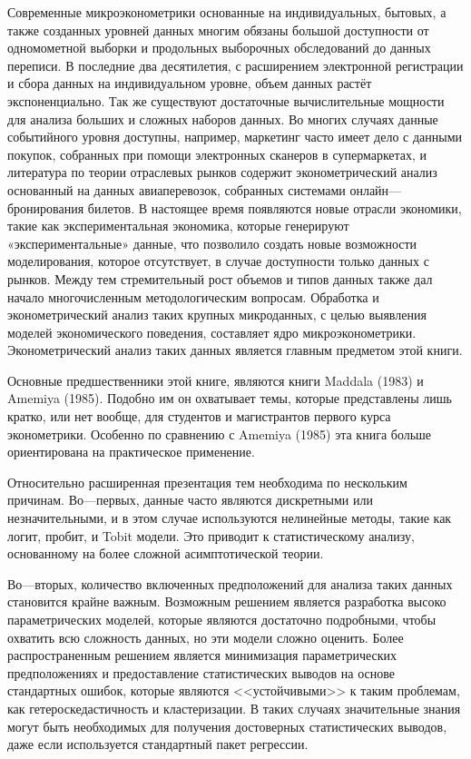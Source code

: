 	
	Современные микроэконометрики основанные на индивидуальных, бытовых, а также созданных уровней данных многим обязаны большой доступности от одномометной выборки и продольных выборочных обследований до данных переписи. В последние два десятилетия, с расширением электронной регистрации и сбора данных на индивидуальном уровне, объем данных растёт экспоненциально. Так же существуют достаточные вычислительные мощности для анализа больших и сложных наборов данных. Во многих случаях данные событийного уровня доступны, например, маркетинг часто имеет дело с данными покупок, собранных при помощи электронных сканеров в супермаркетах, и литература по теории отраслевых рынков содержит эконометрический анализ основанный на данных авиаперевозок, собранных системами онлайн---бронирования билетов. В настоящее время появляются новые отрасли экономики, такие как экспериментальная экономика, которые генерируют «экспериментальные» данные, что позволило создать новые возможности моделирования, которое отсутствует, в случае доступности только данных с рынков. Между тем стремительный рост объемов и типов данных также дал начало многочисленным методологическим вопросам. Обработка и эконометрический анализ таких крупных микроданных, с целью выявления моделей экономического поведения, составляет ядро микроэконометрики. Эконометрический анализ таких данных является главным предметом этой книги.
	
	
	Основные предшественники этой книге, являются книги Maddala (1983) и Amemiya (1985). Подобно им он охватывает темы, которые представлены лишь кратко, или нет вообще, для студентов и магистрантов первого курса эконометрики. Особенно по сравнению с Amemiya (1985) эта книга больше ориентирована на практическое применение.
	
	
	Относительно расширенная презентация тем необходима по нескольким причинам. Во---первых, данные часто являются дискретными или незначительными, и в этом случае используются нелинейные методы, такие как логит, пробит, и Tobit модели. Это приводит к статистическому анализу, основанному на более сложной асимптотической теории.
	
	
	Во---вторых, количество включенных предположений для анализа таких данных становится крайне важным. Возможным решением является разработка высоко параметрических моделей, которые являются достаточно подробными, чтобы охватить всю сложность данных, но эти модели сложно оценить. Более распространенным решением является минимизация параметрических предположениях и предоставление статистических выводов на основе стандартных ошибок, которые являются <<устойчивыми>> к таким проблемам, как гетероскедастичность и кластеризации. В таких случаях значительные знания могут быть необходимых для получения достоверных статистических выводов, даже если используется стандартный пакет регрессии.
	
